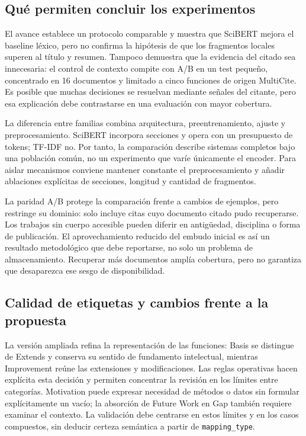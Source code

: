 \documentclass[10pt,a4paper,twocolumn]{article}
\begin{document}
\subsection{Qué permiten concluir los experimentos}
El avance establece un protocolo comparable y muestra que SciBERT mejora el baseline léxico, pero no confirma la hipótesis de que los fragmentos locales superen al título y resumen. Tampoco demuestra que la evidencia del citado sea innecesaria: el control de contexto compite con A/B en un test pequeño, concentrado en 16 documentos y limitado a cinco funciones de origen MultiCite. Es posible que muchas decisiones se resuelvan mediante señales del citante, pero esa explicación debe contrastarse en una evaluación con mayor cobertura.

La diferencia entre familias combina arquitectura, preentrenamiento, ajuste y preprocesamiento. SciBERT incorpora secciones y opera con un presupuesto de tokens; TF-IDF no. Por tanto, la comparación describe sistemas completos bajo una población común, no un experimento que varíe únicamente el encoder. Para aislar mecanismos conviene mantener constante el preprocesamiento y añadir ablaciones explícitas de secciones, longitud y cantidad de fragmentos.

La paridad A/B protege la comparación frente a cambios de ejemplos, pero restringe su dominio: solo incluye citas cuyo documento citado pudo recuperarse. Los trabajos sin cuerpo accesible pueden diferir en antigüedad, disciplina o forma de publicación. El aprovechamiento reducido del embudo inicial es así un resultado metodológico que debe reportarse, no solo un problema de almacenamiento. Recuperar más documentos amplía cobertura, pero no garantiza que desaparezca ese sesgo de disponibilidad.

\subsection{Calidad de etiquetas y cambios frente a la propuesta}
La versión ampliada refina la representación de las funciones: Basis se distingue de Extends y conserva su sentido de fundamento intelectual, mientras Improvement reúne las extensiones y modificaciones. Las reglas operativas hacen explícita esta decisión y permiten concentrar la revisión en los límites entre categorías. Motivation puede expresar necesidad de métodos o datos sin formular explícitamente un vacío; la absorción de Future Work en Gap también requiere examinar el contexto. La validación debe centrarse en estos límites y en los casos compuestos, sin deducir certeza semántica a partir de \texttt{mapping\_type}.
\end{document}
